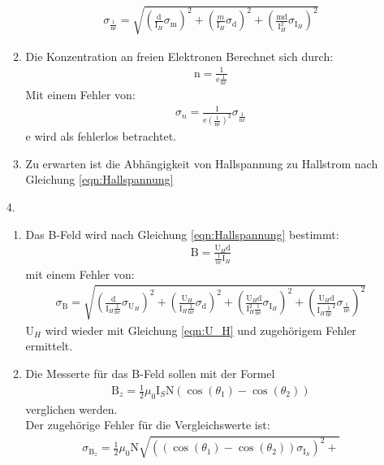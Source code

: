 \documentclass[12pt]{scrartcl}
\begin{document}
\begin{enumerate}
\begin{enumerate}
\begin{align}
\sigma_{\frac{1}{\text{ne}}} = 
\sqrt{\left(\frac{\text{d}}
{\text{I}_H}\sigma_{\text{m}}\right)^2+
\left(\frac{m}
{\text{I}_H}\sigma_{\text{d}}\right)^2+
\left(\frac{\text{m} \text{d}}
{\text{I}_H^2}\sigma_{\text{I}_H}\right)^2}
\label{eqn:Hallspannung_Fehler}
\end{align}
\item
Die Konzentration an freien Elektronen Berechnet sich durch:
\begin{align}
\text{n} = \frac{1}{\text{e}\frac{1}{\text{ne}}}
\end{align}
Mit einem Fehler von:
\begin{align}
\sigma_n = \frac{1}{\text{e}\left(\frac{1}{\text{ne}}\right)^2}\sigma_{\frac{1}{\text{ne}}}
\end{align}
e wird als fehlerlos betrachtet.
\item
Zu erwarten ist die Abhängigkeit von Hallspannung zu Hallstrom nach Gleichung \ref{eqn:Hallspannung}
\end{enumerate}
\item[4.]
\begin{enumerate}
\item
Das B-Feld wird nach Gleichung \ref{eqn:Hallspannung} bestimmt:
\begin{align*}
 \text{B}= \frac{\text{U}_H \text{d}}{\frac{1}{ne} \text{I}_H}
\end{align*}
mit einem Fehler von:
\begin{align}
\sigma_{\text{B}} = 
\sqrt{\left(\frac{\text{d}}
{\text{I}_H \frac{1}{\text{ne}}}\sigma_{\text{U}_H}\right)^2+
\left(\frac{\text{U}_H}
{\text{I}_H \frac{1}{\text{ne}}}\sigma_{\text{d}}\right)^2+
\left(\frac{\text{U}_H \text{d}}
{\text{I}_H^2 \frac{1}{\text{ne}}}\sigma_{\text{I}_H}\right)^2+
\left(\frac{\text{U}_H \text{d}}
{\text{I}_H \frac{1}{\text{ne}}^2}\sigma_{\frac{1}{\text{ne}}}\right)^2}
\end{align}
U$_H$ wird wieder mit Gleichung \ref{eqn:U_H}
und zugehörigem Fehler ermittelt.
\item
Die Messerte für das B-Feld sollen mit der Formel
\begin{align}
\text{B}_z = \frac{1}{2} \mu_0 \text{I}_S \text{N} (\cos(\theta_1) - \cos(\theta_2))
\label{eqn:Aufgabe 3_TD_B-Feld_1} 
\end{align}
verglichen werden.\\
Der zugehörige Fehler für die Vergleichswerte ist:
\begin{align}
\sigma_{\text{B}_z} = \frac{1}{2} \mu_0 \text{N}
\sqrt{\left((\cos(\theta_1) - \cos(\theta_2)) \sigma_{\text{I}_S}\right)^2+
}
\end{align}
\end{enumerate}
\end{enumerate}
\end{document}
